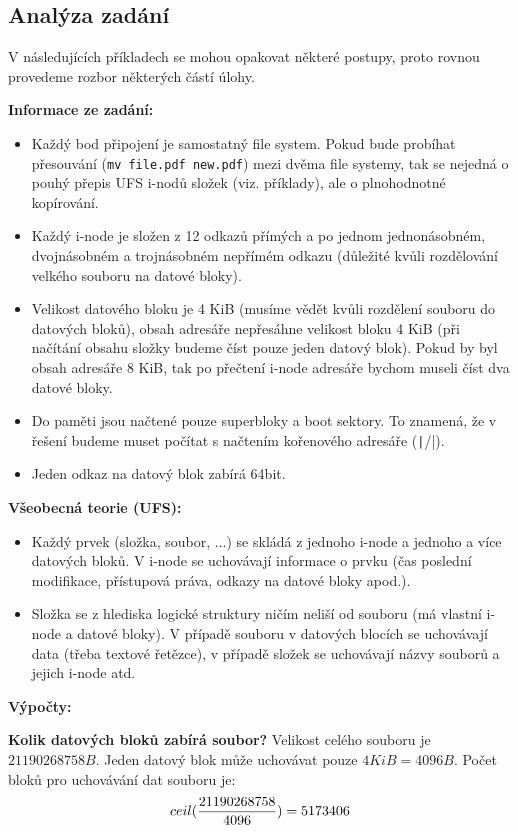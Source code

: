 \subsection{Analýza zadání}
V následujících příkladech se mohou opakovat některé postupy, proto rovnou provedeme rozbor některých částí úlohy.

\textbf{Informace ze zadání:}
\begin{itemize}
    \item Každý bod připojení je samostatný file system. Pokud bude probíhat přesouvání (\texttt{mv file.pdf new.pdf}) mezi dvěma file systemy, tak se nejedná o pouhý přepis UFS i-nodů složek (viz. příklady), ale o plnohodnotné kopírování.
    \item Každý i-node je složen z 12 odkazů přímých a po jednom jednonásobném, dvojnásobném a trojnásobném nepřímém odkazu (důležité kvůli rozdělování velkého souboru na datové bloky).
    \item Velikost datového bloku je 4 KiB (musíme vědět kvůli rozdělení souboru do datových bloků), obsah adresáře nepřesáhne velikost bloku 4 KiB (při načítání obsahu složky budeme číst pouze jeden datový blok). Pokud by byl obsah adresáře 8 KiB, tak po přečtení i-node adresáře bychom museli číst dva datové bloky.
    \item Do paměti jsou načtené pouze superbloky a boot sektory. To znamená, že v řešení budeme muset počítat s načtením kořenového adresáře (\texttt|/|).
    \item Jeden odkaz na datový blok zabírá 64bit.
\end{itemize}

\textbf{Všeobecná teorie (UFS):}
\begin{itemize}
    \item Každý prvek (složka, soubor, ...) se skládá z jednoho i-node a jednoho a více datových bloků. V i-node se uchovávají informace o prvku (čas poslední modifikace, přístupová práva, odkazy na datové bloky apod.).
    \item Složka se z hlediska logické struktury ničím neliší od souboru (má vlastní i-node a datové bloky). V případě souboru v datových blocích se uchovávají data (třeba textové řetězce), v případě složek se uchovávají názvy souborů a jejich i-node atd.
\end{itemize}

\textbf{Výpočty:}

\textbf{Kolik datových bloků zabírá soubor?}
Velikost celého souboru je $21190268758B$. Jeden datový blok může uchovávat pouze $4KiB = 4096B$. Počet bloků pro uchovávání dat souboru je:
$$ceil({21190268758 \over 4096}) = 5173406$$

